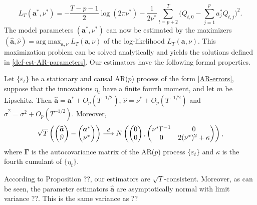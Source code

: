 \[ L_T(\boldsymbol{a}^*,\nu^*) =  -\frac{T-p-1}{2} \log(2 \pi \nu^*) - \frac{1}{2 \nu^*} \sum\limits_{t=p+2}^T \Big( Q_{t,0} - \sum_{j=1}^p a_j^* Q_{t,j} \Big)^2. \]
The model parameters $(\boldsymbol{a}^*,\nu^*)$ can now be estimated by the maximizers $(\widehat{\boldsymbol{a}},\widehat{\nu}) = \text{arg} \max_{\boldsymbol{a},\nu} L_T(\boldsymbol{a},\nu)$ of the log-likelihood $L_T(\boldsymbol{a},\nu)$. This maximization problem can be solved analytically and yields the solutions defined in \eqref{def-est-AR-parameters}. Our estimators have the following formal properties. 
\begin{prop}\label{prop-lrv}
Let $\{ \varepsilon_t \}$ be a stationary and causal AR($p$) process of the form \eqref{AR-errors}, suppose that the innovations $\eta_t$ have a finite fourth moment, and let $m$ be Lipschitz. Then $\widehat{\boldsymbol{a}} = \boldsymbol{a}^* + O_p(T^{-1/2})$, $\widehat{\nu} = \nu^* + O_p(T^{-1/2})$ and $\widehat{\sigma}^2 = \sigma^2 + O_p(T^{-1/2})$. Moreover,   
\[ \sqrt{T} \left( \begin{pmatrix} \widehat{\boldsymbol{a}} \\ \widehat{\nu} \end{pmatrix} - \begin{pmatrix} \boldsymbol{a}^* \\ \nu^* \end{pmatrix} \right) \stackrel{d}{\longrightarrow} N \left( \begin{pmatrix} 0 \\ 0 \end{pmatrix}, \begin{pmatrix} \nu^* \Gamma^{-1} & 0 \\ 0 & 2 (\nu^*)^2 + \kappa \end{pmatrix} \right), \]
where $\boldsymbol{\Gamma}$ is the autocovariance matrix of the AR($p$) process $\{ \varepsilon_t \}$ and $\kappa$ is the fourth cumulant of $\{ \eta_t \}$.  
\end{prop}
According to Proposition ??, our estimators are $\sqrt{T}$-consistent. Moreover, as can be seen, the parameter estimators $\widehat{\boldsymbol{a}}$ are asymptotically normal with limit variance ??. This is the same variance as ??


